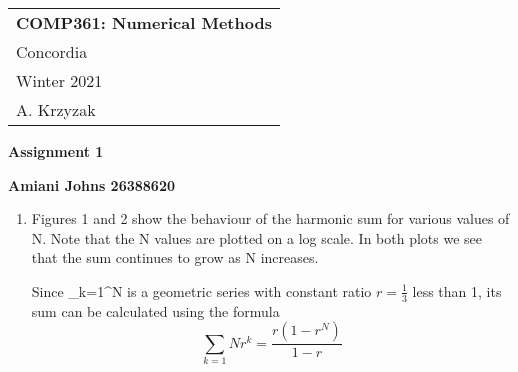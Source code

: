 \documentclass[letterpaper,12pt]{article} %
\begin{document}

\thispagestyle{empty} %

\begin{tabular}{p{15.5cm}} %
{\large \bf COMP361: Numerical Methods} \\
Concordia \\ Winter 2021 \\ A. Krzyzak
\hline %
\\
\end{tabular} %

\vspace*{0.3cm} %

\begin{center} %
	{\Large \bf Assignment 1} %
	\vspace{2mm}
	
	{\bf Amiani Johns 26388620}
		
\end{center}  

\vspace{0.4cm}



\begin{enumerate}

  \item {
    Figures 1 and 2 show the behaviour of the harmonic sum for various values of N. Note that the N values are plotted on a log scale. In both plots we see that the sum continues to grow as N increases.

    Since \sum_{k=1}^{N}  is a geometric series with constant ratio \(r=\frac{1}{3}\) less than 1, its sum can be calculated using the formula\cite{geo-series}
    \[ \sum_{k=1}{N} r^k = \frac{r(1-r^N)}{1-r} \]
  }

\end{enumerate}

\medskip
\printbibliography
\end{document}
